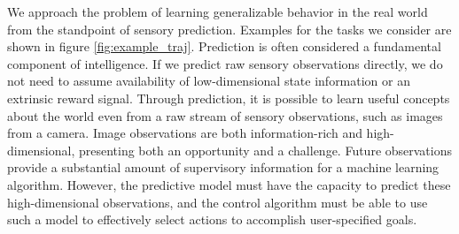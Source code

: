 We approach the problem of learning generalizable behavior in the real world from the standpoint of sensory prediction. Examples for the tasks we consider are shown in figure \ref{fig:example_traj}. Prediction is often considered a fundamental component of intelligence. If we predict raw sensory observations directly, we do not need to assume availability of low-dimensional state information or an extrinsic reward signal. Through prediction, it is possible to learn useful concepts about the world even from a raw stream of sensory observations, such as images from a camera. Image observations are both information-rich and high-dimensional, presenting both an opportunity and a challenge. Future observations provide a substantial amount of supervisory information for a machine learning algorithm. However, the predictive model must have the capacity to predict these high-dimensional observations, and the control algorithm must be able to use such a model to effectively select actions to accomplish user-specified goals.


